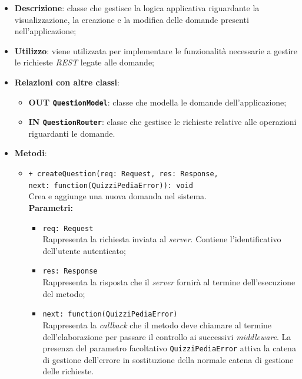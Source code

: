 	\begin{itemize}
		\item \textbf{Descrizione}:
		classe che gestisce la logica applicativa riguardante la visualizzazione, la creazione e la modifica delle domande presenti nell'applicazione;
		\item \textbf{Utilizzo}:
		viene utilizzata per implementare le funzionalità necessarie a gestire le richieste \textit{REST} legate alle domande;
		\item \textbf{Relazioni con altre classi}:
			\begin{itemize}
				\item \textbf{OUT \texttt{QuestionModel}}:
				classe che modella le domande dell'applicazione;
				\item \textbf{IN \texttt{QuestionRouter}}:
				classe che gestisce le richieste relative alle operazioni riguardanti le domande.
			\end{itemize}
		\item \textbf{Metodi}:
			\begin{itemize}
				\item \texttt{+ createQuestion(req: Request, res: Response,\\ next: function(QuizziPediaError)): void} \\
				Crea e aggiunge una nuova domanda nel sistema. \\
				\textbf{Parametri:}
				\begin{itemize}
					\item \texttt{req: Request} \\
					Rappresenta la richiesta inviata al \textit{server}. Contiene l'identificativo dell'utente autenticato;
					\item \texttt{res: Response} \\
					Rappresenta la risposta che il \textit{server} fornirà al termine dell'esecuzione del metodo;
					\item \texttt{next: function(QuizziPediaError)} \\
					Rappresenta la \textit{callback} che il metodo deve chiamare al termine dell'elaborazione per passare il controllo ai successivi \textit{middleware}. La presenza del parametro facoltativo \texttt{QuizziPediaError} attiva la catena di gestione dell'errore in sostituzione della normale catena di gestione delle richieste.
				\end{itemize}
				

\end{itemize}
\end{itemize}
